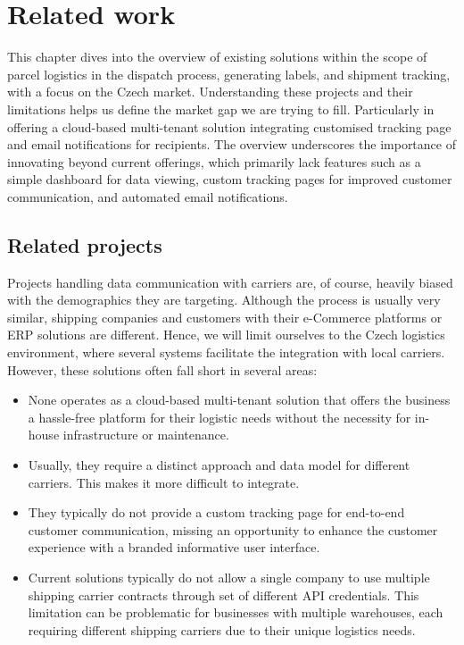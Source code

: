 \chapter{Related work}
\label{chap:related-work}
This chapter dives into the overview of existing solutions within the scope of parcel logistics in the dispatch process, generating labels, and shipment tracking, with a focus on the Czech market.
Understanding these projects and their limitations helps us define the market gap we are trying to fill.
Particularly in offering a cloud-based multi-tenant solution integrating customised tracking page and email notifications for recipients.
The overview underscores the importance of innovating beyond current offerings, which primarily lack features such as a simple dashboard for data viewing, custom tracking pages for improved customer communication, and automated email notifications.

\section{Related projects}
\label{sec:related-projects}

Projects handling data communication with carriers are, of course, heavily biased with the demographics they are targeting. 
Although the process is usually very similar, shipping companies and customers with their e-Commerce platforms or \ac{ERP} solutions are different.
Hence, we will limit ourselves to the Czech logistics environment, where several systems facilitate the integration with local carriers. However, these solutions often fall short in several areas:
\begin{itemize}
    \item None operates as a cloud-based multi-tenant solution that offers the business a hassle-free platform for their logistic needs without the necessity for in-house infrastructure or maintenance.
    \item Usually, they require a distinct approach and data model for different carriers. This makes it more difficult to integrate.
    \item They typically do not provide a custom tracking page for end-to-end customer communication, missing an opportunity to enhance the customer experience with a branded informative user interface.
    \item Current solutions typically do not allow a single company to use multiple shipping carrier contracts through set of different API credentials. This limitation can be problematic for businesses with multiple warehouses, each requiring different shipping carriers due to their unique logistics needs.
\end{itemize}

